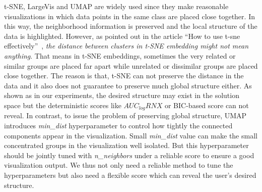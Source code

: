t-SNE, LargeVis and UMAP are widely used since they make reasonable visualizations in which data points in the same class are placed close together.
In this way, the neighborhood information is preserved and the local structure of the data is highlighted.
However, as pointed out in the article ``How to use t-sne effectively''~\cite{wattenberg2016use}, \emph{the distance between clusters in t-SNE embedding might not mean anything}.
That means in t-SNE embeddings, sometimes the very related or similar groups are placed far apart while unrelated or dissimilar groups are placed close together.
The reason is that, t-SNE can not preserve the distance in the data and it also does not guarantee to preserve much global structure either.
As shown as in our experiments, the desired structure may exist in the solution space but the deterministic scores like $AUC_{log}RNX$ or BIC-based score can not reveal.
In contrast, to issue the problem of preserving global structure, UMAP introduces \emph{min\_dist} hyperparameter to control how tightly the connected components appear in the visualization.
Small \emph{min\_dist} value can make the small concentrated groups in the visualization well isolated.
But this hyperparameter should be jointly tuned with \emph{n\_neighbors} under a reliable score to ensure a good visualization output.
We thus not only need a reliable method to tune the hyperparameters but also need a flexible score which can reveal the user's desired structure.


